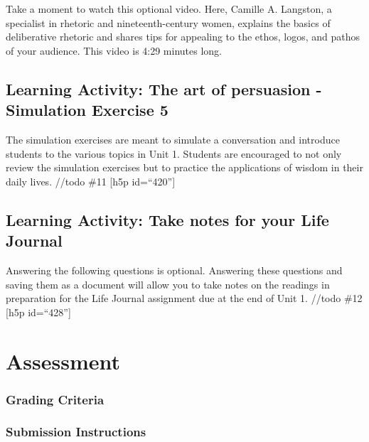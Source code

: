 \documentclass[
]{book}
\begin{document}
\begin{reflect}
Take a moment to watch this optional video. Here, Camille A. Langston, a specialist in rhetoric and nineteenth-century women, explains the basics of deliberative rhetoric and shares tips for appealing to the ethos, logos, and pathos of your audience. This video is 4:29 minutes long.
\end{reflect}

\hypertarget{learning-activity-the-art-of-persuasion---simulation-exercise-5}{%
\subsection{Learning Activity: The art of persuasion - Simulation Exercise 5}\label{learning-activity-the-art-of-persuasion---simulation-exercise-5}}

The simulation exercises are meant to simulate a conversation and introduce students to the various topics in Unit 1. Students are encouraged to not only review the simulation exercises but to practice the applications of wisdom in their daily lives.
//todo \#11
{[}h5p id=``420''{]}

\hypertarget{learning-activity-take-notes-for-your-life-journal-5}{%
\subsection{Learning Activity: Take notes for your Life Journal}\label{learning-activity-take-notes-for-your-life-journal-5}}

Answering the following questions is optional. Answering these questions and saving them as a document will allow you to take notes on the readings in preparation for the Life Journal assignment due at the end of Unit 1.
//todo \#12
{[}h5p id=``428''{]}

\hypertarget{assessment}{%
\section{Assessment}\label{assessment}}

\hypertarget{grading-criteria}{%
\subsubsection{Grading Criteria}\label{grading-criteria}}

\hypertarget{submission-instructions}{%
\subsubsection{Submission Instructions}\label{submission-instructions}}
\end{document}
